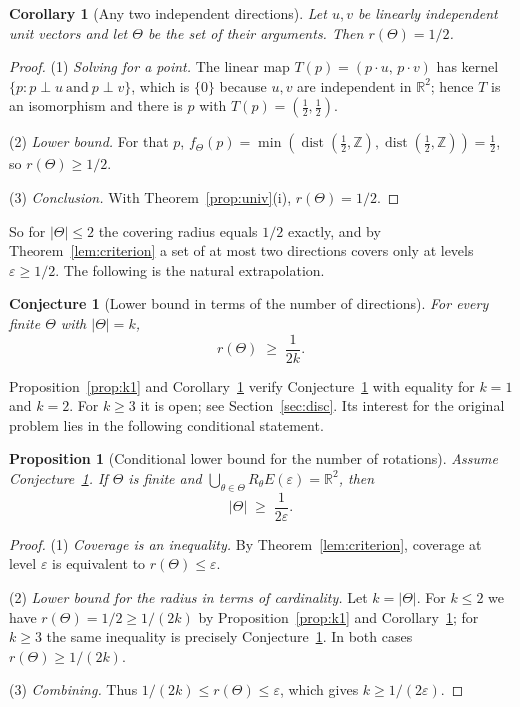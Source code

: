 \documentclass[11pt]{article}
\theoremstyle{plain}
\newtheorem{proposition}[theorem]{Proposition}
\newtheorem{corollary}[theorem]{Corollary}
\newtheorem{conjecture}[theorem]{Conjecture}
\theoremstyle{definition}
\theoremstyle{remark}
\newcommand{\dZ}{\operatorname{dist}}
\newcommand{\R}{\mathbb{R}}
\newcommand{\Z}{\mathbb{Z}}
\begin{document}
\begin{corollary}[Any two independent directions]
\label{cor:two}
Let $u,v$ be linearly independent unit vectors and let $\Theta$ be the set of their arguments. Then
$r(\Theta)=1/2$.
\end{corollary}

\begin{proof}
(1) \emph{Solving for a point.} The linear map $T(p)=(p\cdot u,\,p\cdot v)$ has kernel
$\{p : p\perp u\ \text{and}\ p\perp v\}$, which is $\{0\}$ because $u,v$ are independent in $\R^2$;
hence $T$ is an isomorphism and there is $p$ with $T(p)=(\tfrac12,\tfrac12)$.

(2) \emph{Lower bound.} For that $p$,
$f_\Theta(p)=\min(\dZ(\tfrac12,\Z),\dZ(\tfrac12,\Z))=\tfrac12$, so $r(\Theta)\ge1/2$.

(3) \emph{Conclusion.} With Theorem~\ref{prop:univ}(i), $r(\Theta)=1/2$.
\end{proof}

So for $|\Theta|\le2$ the covering radius equals $1/2$ exactly, and by
Theorem~\ref{lem:criterion} a set of at most two directions covers only at levels
$\varepsilon\ge1/2$. The following is the natural extrapolation.

\begin{conjecture}[Lower bound in terms of the number of directions]
\label{conj:main}
For every finite $\Theta$ with $|\Theta|=k$,
\[
r(\Theta)\;\ge\;\frac{1}{2k}.
\]
\end{conjecture}

Proposition~\ref{prop:k1} and Corollary~\ref{cor:two} verify Conjecture~\ref{conj:main} with equality
for $k=1$ and $k=2$. For $k\ge3$ it is open; see Section~\ref{sec:disc}. Its interest for the original
problem lies in the following conditional statement.

\begin{proposition}[Conditional lower bound for the number of rotations]
\label{prop:cond}
Assume Conjecture~\ref{conj:main}. If $\Theta$ is finite and
$\bigcup_{\theta\in\Theta}R_\theta E(\varepsilon)=\R^2$, then
\[
|\Theta|\;\ge\;\frac{1}{2\varepsilon}.
\]
\end{proposition}

\begin{proof}
(1) \emph{Coverage is an inequality.} By Theorem~\ref{lem:criterion}, coverage at level $\varepsilon$ is
equivalent to $r(\Theta)\le\varepsilon$.

(2) \emph{Lower bound for the radius in terms of cardinality.} Let $k=|\Theta|$. For $k\le2$ we have
$r(\Theta)=1/2\ge1/(2k)$ by Proposition~\ref{prop:k1} and Corollary~\ref{cor:two}; for $k\ge3$ the same
inequality is precisely Conjecture~\ref{conj:main}. In both cases $r(\Theta)\ge1/(2k)$.

(3) \emph{Combining.} Thus $1/(2k)\le r(\Theta)\le\varepsilon$, which gives $k\ge1/(2\varepsilon)$.
\end{proof}
\end{document}
